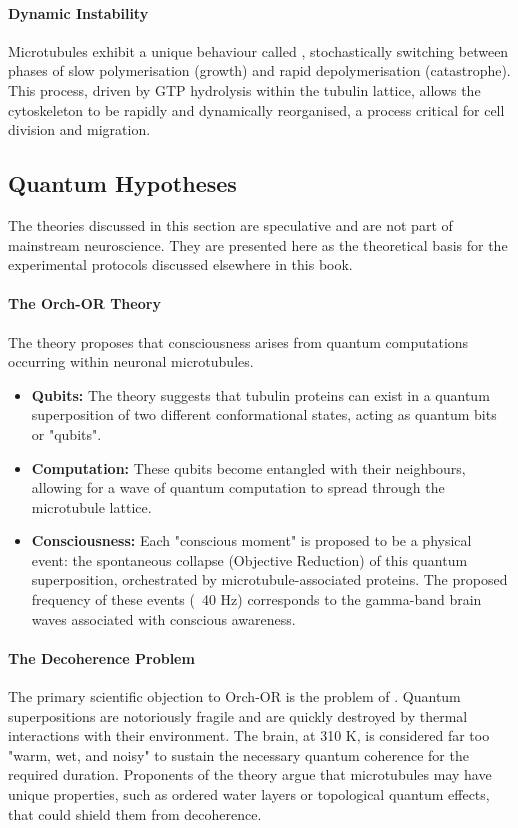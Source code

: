 \paragraph{Dynamic Instability}
Microtubules exhibit a unique behaviour called , stochastically switching between phases of slow polymerisation (growth) and rapid depolymerisation (catastrophe). This process, driven by GTP hydrolysis within the tubulin lattice, allows the cytoskeleton to be rapidly and dynamically reorganised, a process critical for cell division and migration.


\subsection{Quantum Hypotheses}

\begin{warningbox}
    The theories discussed in this section are speculative and are not part of mainstream neuroscience. They are presented here as the theoretical basis for the experimental protocols discussed elsewhere in this book.
\end{warningbox}

\paragraph{The Orch-OR Theory}
The  theory proposes that consciousness arises from quantum computations occurring within neuronal microtubules.
\begin{itemize}
    \item \textbf{Qubits:} The theory suggests that tubulin proteins can exist in a quantum superposition of two different conformational states, acting as quantum bits or "qubits".
    \item \textbf{Computation:} These qubits become entangled with their neighbours, allowing for a wave of quantum computation to spread through the microtubule lattice.
    \item \textbf{Consciousness:} Each "conscious moment" is proposed to be a physical event: the spontaneous collapse (Objective Reduction) of this quantum superposition, orchestrated by microtubule-associated proteins. The proposed frequency of these events (~40 Hz) corresponds to the gamma-band brain waves associated with conscious awareness.
\end{itemize}

\paragraph{The Decoherence Problem}
The primary scientific objection to Orch-OR is the problem of . Quantum superpositions are notoriously fragile and are quickly destroyed by thermal interactions with their environment. The brain, at 310 K, is considered far too "warm, wet, and noisy" to sustain the necessary quantum coherence for the required duration. Proponents of the theory argue that microtubules may have unique properties, such as ordered water layers or topological quantum effects, that could shield them from decoherence.


